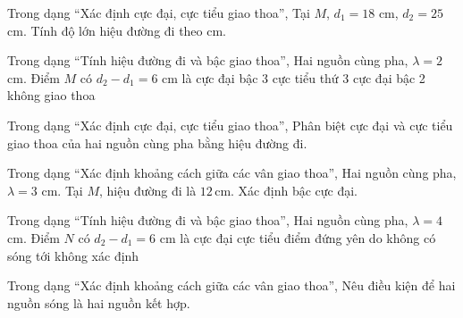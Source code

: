 \begin{ex}
Trong dạng “Xác định cực đại, cực tiểu giao thoa”, Tại $M$, $d_1=18$ cm, $d_2=25$ cm. Tính độ lớn hiệu đường đi theo cm.
\end{ex}

\begin{ex}
Trong dạng “Tính hiệu đường đi và bậc giao thoa”, Hai nguồn cùng pha, $\lambda=2$ cm. Điểm $M$ có $d_2-d_1=6$ cm là
\choice
{\True cực đại bậc 3}
{cực tiểu thứ 3}
{cực đại bậc 2}
{không giao thoa}
\end{ex}

\begin{ex}
Trong dạng “Xác định cực đại, cực tiểu giao thoa”, Phân biệt cực đại và cực tiểu giao thoa của hai nguồn cùng pha bằng hiệu đường đi.
\choiceTF

\end{ex}

\begin{ex}
Trong dạng “Xác định khoảng cách giữa các vân giao thoa”, Hai nguồn cùng pha, $\lambda=3$ cm. Tại $M$, hiệu đường đi là $12\,\text{cm}$. Xác định bậc cực đại.
\end{ex}

\begin{ex}
Trong dạng “Tính hiệu đường đi và bậc giao thoa”, Hai nguồn cùng pha, $\lambda=4$ cm. Điểm $N$ có $d_2-d_1=6$ cm là
\choice
{cực đại}
{\True cực tiểu}
{điểm đứng yên do không có sóng tới}
{không xác định}
\end{ex}

\begin{ex}
Trong dạng “Xác định khoảng cách giữa các vân giao thoa”, Nêu điều kiện để hai nguồn sóng là hai nguồn kết hợp.
\choiceTF

\end{ex}

